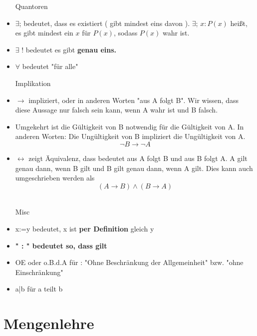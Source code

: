 \documentclass[smallheadings,headsepline,12pt,a4paper]{scrartcl}
\begin{document}
\begin{itemize}
\item[Quantoren] 
\item 	$\exists$; bedeutet, dass es existiert ( gibt mindest eins davon ). $\exists$; $x : P(x)$ heißt, es gibt mindest ein $x$ für $P(x)$, sodass $P(x)$ wahr ist.\\
\item     $\exists$ ! bedeutet es gibt \textbf{genau eins.} \\
\item $\forall$ bedeutet "für alle" \\

\item[Implikation]
\item $\rightarrow$ impliziert, oder in anderen Worten "aus A folgt B". Wir wissen, dass diese Aussage nur falsch sein kann, wenn A wahr ist und B falsch.\\

\item Umgekehrt ist die Gültigkeit von B notwendig für die Gültigkeit von A. In anderen Worten: Die Ungültigkeit von B impliziert die Ungültigkeit von A. $$ \neg B \rightarrow \neg A $$

\item $\leftrightarrow$ zeigt Äquivalenz, dass bedeutet aus A folgt B und aus B folgt A. A gilt genau dann, wenn B gilt und B gilt genau dann, wenn A gilt. Dies kann auch umgeschrieben werden als 
$$ ( A \rightarrow B ) \wedge ( B \rightarrow A ) $$ \\

\item[Misc]
\item x:=y bedeutet, x ist \textbf{per Definition} gleich y 
\item  \textbf{" : " bedeutet so, dass gilt}
\item OE oder o.B.d.A für : "Ohne Beschränkung der Allgemeinheit" bzw. "ohne Einschränkung"
\item a|b für a teilt b


\end{itemize}

\section*{Mengenlehre}
\end{document}
